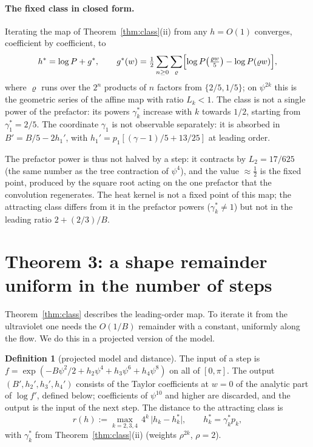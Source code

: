 \documentclass[11pt,a4paper]{article}
\theoremstyle{definition}
\newtheorem{definition}[lemma]{Definition}
\theoremstyle{remark}
\begin{document}
\paragraph{The fixed class in closed form.}
Iterating the map of Theorem~\ref{thm:class}(ii) from any $h=O(1)$ converges, coefficient by coefficient, to
\[
h^*=\log P+g^*,\qquad g^*(w)=\tfrac12\sum_{n\ge0}\sum_{\varrho}\Bigl[\log P\bigl(\tfrac{\varrho w}5\bigr)-\log P(\varrho w)\Bigr],
\]
where $\varrho$ runs over the $2^n$ products of $n$ factors from $\{2/5,1/5\}$; on $\psi^{2k}$ this is the geometric series of the affine map with ratio $L_k<1$.
The class is not a single power of the prefactor: its powers $\gamma_k^*$ increase with $k$ towards $1/2$, starting from $\gamma_1^*=2/5$.
The coordinate $\gamma_1$ is not observable separately: it is absorbed in $B'=B/5-2h_1'$, with $h_1'=p_1[(\gamma-1)/5+13/25]$ at leading order.

The prefactor power is thus not halved by a step: it contracts by $L_2=17/625$ (the same number as the tree contraction of $\psi^4$), and the value $\approx\tfrac12$ is the fixed point, produced by the square root acting on the one prefactor that the convolution regenerates.
The heat kernel is not a fixed point of this map; the attracting class differs from it in the prefactor powers ($\gamma_k^*\ne1$) but not in the leading ratio $2+(2/3)/B$.

\section{Theorem 3: a shape remainder uniform in the number of steps}\label{sec:thm3}

Theorem~\ref{thm:class} describes the leading-order map.
To iterate it from the ultraviolet one needs the $O(1/B)$ remainder with a constant, uniformly along the flow.
We do this in a projected version of the model.

\begin{definition}[projected model and distance]\label{def:proj}
The input of a step is $f=\exp(-B\psi^2/2+h_2\psi^4+h_3\psi^6+h_4\psi^8)$ on all of $[0,\pi]$.
The output $(B',h_2',h_3',h_4')$ consists of the Taylor coefficients at $w=0$ of the analytic part of $\log f'$, defined below; coefficients of $\psi^{10}$ and higher are discarded, and the output is the input of the next step.
The distance to the attracting class is
\[
r(h):=\max_{k=2,3,4}\,4^k\,\bigl|h_k-h_k^*\bigr|,\qquad h_k^*=\gamma_k^*p_k ,
\]
with $\gamma_k^*$ from Theorem~\ref{thm:class}(ii) (weights $\rho^{2k}$, $\rho=2$).
\end{definition}
\end{document}
